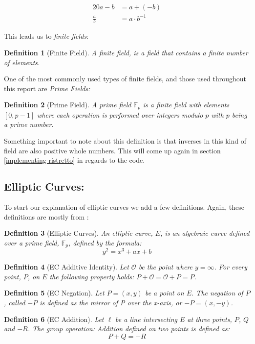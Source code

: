 \documentclass{article}
\newtheorem{definition}{Definition}[section]
\newcommand{\eq}[1]{\begin{alignat*}{20}#1\end{alignat*}}
\renewcommand{\O}{\mathcal{O}}
\newcommand{\F}{\mathbb{F}}
\begin{document}
\eq{
	a-b         &= a + (-b) \\
	\frac{a}{b} &= a \cdot b^{-1}
}

This leads us to \textit{finite fields}:

\begin{definition}[Finite Field]
	A finite field, is a field that contains a finite number of elements.
\end{definition}

One of the most commonly used types of finite fields, and those used
throughout this report are \textit{Prime Fields:} 

\begin{definition}[Prime Field]
	A prime field $\F_p$ is a finite field with elements $[0,p-1]$
	where each operation is performed over integers modulo $p$
	with $p$ being a prime number.
\end{definition}

Something important to note about this definition is that inverses in
this kind of field are also positive whole numbers. This will come up
again in section \ref{implementing-ristretto} in regards to the code.

\subsection{Elliptic Curves:}\label{elliptic-curves}

To start our explanation of elliptic curves we add a few
definitions. Again, these definitions are mostly from
\cite{elliptic-curves}:

\begin{definition}[Elliptic Curves]
	An elliptic curve, $E$, is an algebraic curve defined over a
	prime field, $\F_p$, defined by the formula:
	$$y^2 = x^3 + ax + b$$
\end{definition}

\begin{definition}[EC Additive Identity]
	Let $\O$ be the point where $y = \infty$. For every point, $P$,
	on $E$ the following property holds:
	$P + \O = \O + P = P$.
\end{definition}

\begin{definition}[EC Negation]
	Let $P = (x,y)$ be a point on $E$. The negation of $P$, called $-P$
	is defined as the mirror of P over the x-axis, or $-P = (x,-y)$.
\end{definition}

\begin{definition}[EC Addition]
	Let $\ell$ be a line intersecting $E$ at three points, $P$, $Q$ and
	$-R$. The group operation: Addition defined on two points is defined
	as:
	$$P + Q = {-R}$$
\end{definition}
\end{document}
